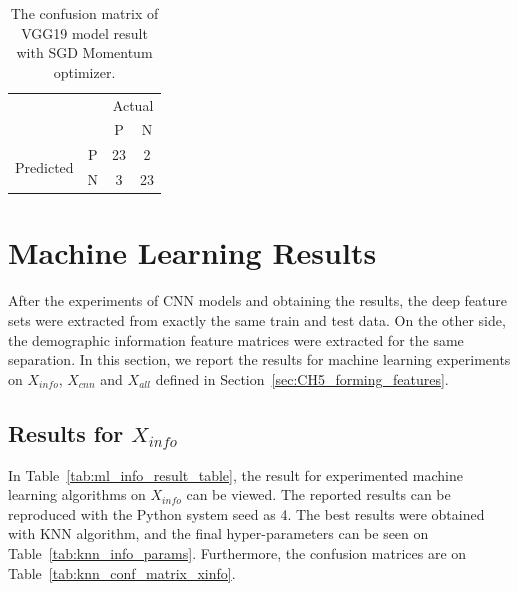 \begin{table}[!h]
\centering
\caption{The confusion matrix of VGG19 model result with SGD Momentum optimizer.}
\label{tab:conf_vgg19}
\begin{tabular}{cc|c|c|}
\cline{3-4}
                                                 &   & \multicolumn{2}{c|}{Actual} \\ \cline{3-4} 
                                                 &   & P            & N            \\ \hline
\multicolumn{1}{|c|}{\multirow{2}{*}{Predicted}} & P & 23           & 2            \\ \cline{2-4} 
\multicolumn{1}{|c|}{}                           & N & 3            & 23           \\ \hline
\end{tabular}
\end{table}

\section{Machine Learning Results}



After the experiments of CNN models and obtaining the results, the deep feature sets were extracted from exactly the same train and test data. On the other side, the demographic information feature matrices were extracted for the same separation. In this section, we report the results for machine learning experiments on $X_{info}$, $X_{cnn}$ and $X_{all}$ defined in Section~\ref{sec:CH5_forming_features}.

\subsection{Results for $X_{info}$} \label{CH6:results_xinfo}

In Table~\ref{tab:ml_info_result_table}, the result for experimented machine learning algorithms on $X_{info}$ can be viewed. The reported results can be reproduced with the Python system seed as 4. The best results were obtained with KNN algorithm, and the final hyper-parameters can be seen on Table~\ref{tab:knn_info_params}. Furthermore, the confusion matrices are on Table~\ref{tab:knn_conf_matrix_xinfo}.

